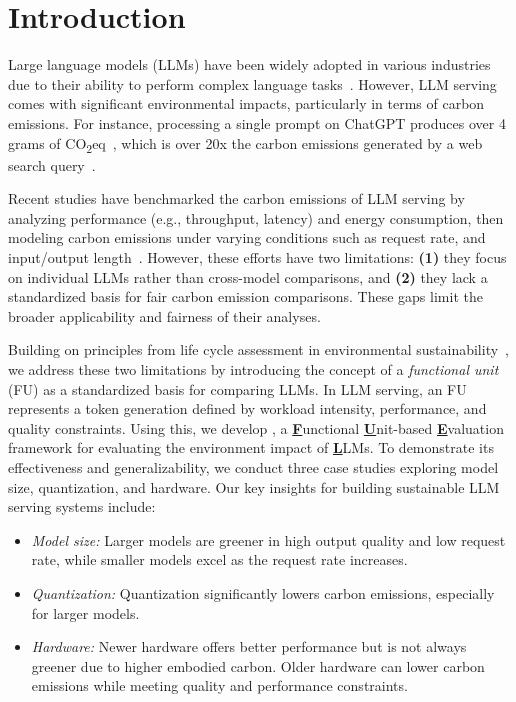 \section{Introduction} \label{sec:intro}

Large language models (LLMs) have been widely adopted in various industries due to their ability to perform complex language tasks~\cite{vu2023freshllms,shen2024hugginggpt,liu2024your}. However, LLM serving comes with significant environmental impacts, particularly in terms of carbon emissions. For instance, processing a single prompt on ChatGPT produces over 4 grams of CO\textsubscript{2}eq~\cite{chatgptcarbon2023}, which is over 20x the carbon emissions generated by a web search query~\cite{whyyourinternet2020}.

Recent studies have benchmarked the carbon emissions of LLM serving by analyzing performance (e.g., throughput, latency) and energy consumption, then modeling carbon emissions under varying conditions such as request rate, and input/output length~\cite{nguyen2024towards,li2024towards,shi2024greenllm,li2024sprout}. However, these efforts have two limitations: \textbf{(1)} they focus on individual LLMs rather than cross-model comparisons, and \textbf{(2)} they lack a standardized basis for fair carbon emission comparisons. These gaps limit the broader applicability and fairness of their analyses.

Building on principles from life cycle assessment in environmental sustainability~\cite{klopffer2014life}, we address these two limitations by introducing the concept of a \emph{functional unit} (FU) as a standardized basis for comparing LLMs. In LLM serving, an FU represents a token generation defined by workload intensity, performance, and quality constraints. Using this, we develop \SYSTEM{}, a \underline{\textbf{F}}unctional \underline{\textbf{U}}nit-based \underline{\textbf{E}}valuation framework for evaluating the environment impact of \underline{\textbf{L}}LMs. To demonstrate its effectiveness and generalizability, we conduct three case studies exploring model size, quantization, and hardware. Our key insights for building sustainable LLM serving systems include:  

\begin{itemize}
    \item \emph{Model size:} Larger models are greener in high output quality and low request rate, while smaller models excel as the request rate increases. 
    \item \emph{Quantization:} Quantization significantly lowers carbon emissions, especially for larger models.  
    \item \emph{Hardware:} Newer hardware offers better performance but is not always greener due to higher embodied carbon. Older hardware can lower carbon emissions while meeting quality and performance constraints.
\end{itemize}

